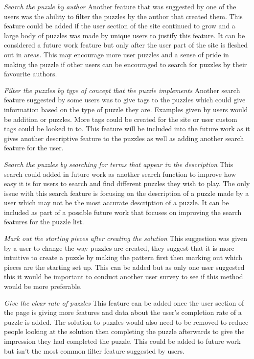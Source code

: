 \documentclass{l4proj}
\begin{document}
\emph{Search the puzzle by author}
Another feature that was suggested by one of the users was the ability to filter the puzzles by the author that created them. This feature could be added if the user section of the site continued to grow and a large body of puzzles was made by unique users to justify this feature. It can be considered a future work feature but only after the user part of the site is fleshed out in areas. This may encourage more user puzzles and a sense of pride in making the puzzle if other users can be encouraged to search for puzzles by their favourite authors.

\emph{Filter the puzzles by type of concept that the puzzle implements}
Another search feature suggested by some users was to give tags to the puzzles which could give information based on the type of puzzle they are. Examples given by users would be addition or puzzles. More tags could be created for the site or user custom tags could be looked in to. This feature will be included into the future work as it gives another descriptive feature to the puzzles as well as adding another search feature for the user. 

\emph{Search the puzzles by searching for terms that appear in the description}
This search could added in future work as another search function to improve how easy it is for users to search and find different puzzles they wish to play. The only issue with this search feature is focusing on the description of a puzzle made by a user which may not be the most accurate description of a puzzle. It can be included as part of a possible future work that focuses on improving the search features for the puzzle list.

\emph{Mark out the starting pieces after creating the solution}
This suggestion was given by a user to change the way puzzles are created, they suggest that it is more intuitive to create a puzzle by making the pattern first then marking out which pieces are the starting set up. This can be added but as only one user suggested this it would be important to conduct another user survey to see if this method would be more preferable.

\emph{Give the clear rate of puzzles}
This feature can be added once the user section of the page is giving more features and data about the user's completion rate of a puzzle is added. The solution to puzzles would also need to be removed to reduce people looking at the solution then completing the puzzle afterwards to give the impression they had completed the puzzle. This could be added to future work but isn't the most common filter feature suggested by users.
\end{document}
